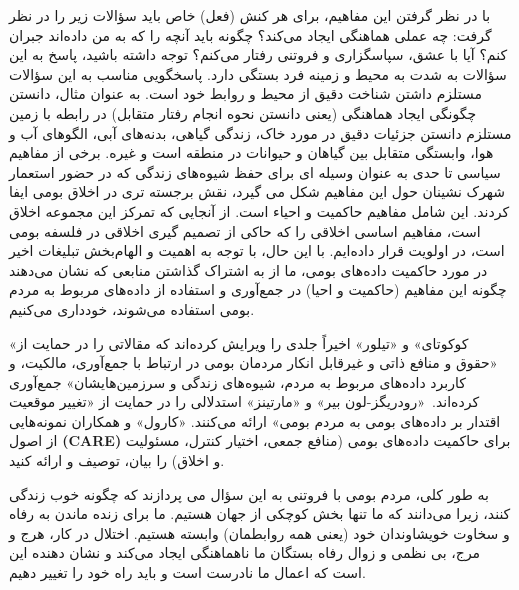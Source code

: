 با در نظر گرفتن این مفاهیم، برای هر کنش (فعل) خاص باید سؤالات زیر را در نظر گرفت: چه عملی هماهنگی ایجاد می‌کند؟ چگونه باید آنچه را که به من داده‌اند جبران کنم؟ آیا با عشق، سپاسگزاری و فروتنی رفتار می‌کنم؟ توجه داشته باشید، پاسخ به این سؤالات به شدت به محیط و زمینه فرد بستگی دارد.
پاسخگویی مناسب به این سؤالات مستلزم داشتن شناخت دقیق از محیط و روابط خود است.
به عنوان مثال، دانستن چگونگی ایجاد هماهنگی (یعنی دانستن نحوه انجام رفتار متقابل) در رابطه با زمین مستلزم دانستن جزئیات دقیق در مورد خاک، زندگی گیاهی، بدنه‌های آبی، الگوهای آب و هوا، وابستگی متقابل بین گیاهان و حیوانات در منطقه است و غیره.
برخی از مفاهیم سیاسی تا حدی به عنوان وسیله ای برای حفظ شیوه‌های زندگی که در حضور استعمار شهرک نشینان حول این مفاهیم شکل می گیرد، نقش برجسته تری در اخلاق بومی ایفا کردند.
این شامل مفاهیم حاکمیت و احیاء است.
از آنجایی که تمرکز این مجموعه اخلاق است، مفاهیم اساسی اخلاقی را که حاکی از تصمیم گیری اخلاقی در فلسفه بومی است، در اولویت قرار داده‌ایم.
با این حال، با توجه به اهمیت و الهام‌بخش تبلیغات اخیر در مورد حاکمیت داده‌های بومی، ما از به اشتراک گذاشتن منابعی که نشان می‌دهند چگونه این مفاهیم (حاکمیت و احیا) در جمع‌آوری و استفاده از داده‌های مربوط به مردم بومی استفاده می‌شوند، خودداری می‌کنیم.

«کوکوتای» و «تیلور» اخیراً جلدی را ویرایش کرده‌اند که مقالاتی را در حمایت از «حقوق و منافع ذاتی و غیرقابل انکار مردمان بومی در ارتباط با جمع‌آوری، مالکیت، و کاربرد داده‌های مربوط به مردم، شیوه‌های زندگی و سرزمین‌هایشان» جمع‌آوری کرده‌اند.\ «رودریگز-لون بیر» و «مارتینز» استدلالی را در حمایت از «تغییر موقعیت اقتدار بر داده‌های بومی به مردم بومی» ارائه می‌کنند.
«کارول» و همکاران نمونه‌هایی از اصول \textenglish{\textbf{(CARE)}}  برای حاکمیت داده‌های بومی (منافع جمعی، اختیار کنترل، مسئولیت و اخلاق) را بیان، توصیف و ارائه کنید.

به طور کلی، مردم بومی با فروتنی به این سؤال می پردازند که چگونه خوب زندگی کنند، زیرا می‌دانند که ما تنها بخش کوچکی از جهان هستیم.
ما برای زنده ماندن به رفاه و سخاوت خویشاوندان خود (یعنی همه روابطمان) وابسته هستیم.
اختلال در کار، هرج و مرج، بی نظمی و زوال رفاه بستگان ما ناهماهنگی ایجاد می‌کند و نشان دهنده این است که اعمال ما نادرست است و باید راه خود را تغییر دهیم.



